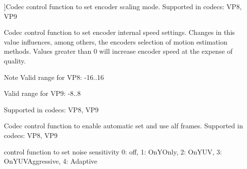 \begin{Desc}
\begin{description}
{}]Codec control function to set encoder scaling mode. Supported in codecs\+: V\+P8, V\+P9 \item[{\em 
V\+P8\+E\+\_\+\+S\+E\+T\+\_\+\+C\+P\+U\+U\+S\+ED\hypertarget{group__vp8__encoder_gga6deae3d561c838952552c3d3756322eca953ff0eaa2fcdc2ecd627e449b026853}{}\label{group__vp8__encoder_gga6deae3d561c838952552c3d3756322eca953ff0eaa2fcdc2ecd627e449b026853}
}]Codec control function to set encoder internal speed settings. Changes in this value influences, among others, the encoder\textquotesingle{}s selection of motion estimation methods. Values greater than 0 will increase encoder speed at the expense of quality.

\begin{DoxyNote}{Note}
Valid range for V\+P8\+: -\/16..16 

Valid range for V\+P9\+: -\/8..8
\end{DoxyNote}
Supported in codecs\+: V\+P8, V\+P9 \item[{\em 
V\+P8\+E\+\_\+\+S\+E\+T\+\_\+\+E\+N\+A\+B\+L\+E\+A\+U\+T\+O\+A\+L\+T\+R\+EF\hypertarget{group__vp8__encoder_gga6deae3d561c838952552c3d3756322eca24a5530efabb8b4949d01622b1d72cb0}{}\label{group__vp8__encoder_gga6deae3d561c838952552c3d3756322eca24a5530efabb8b4949d01622b1d72cb0}
}]Codec control function to enable automatic set and use alf frames. Supported in codecs\+: V\+P8, V\+P9 \item[{\em 
V\+P8\+E\+\_\+\+S\+E\+T\+\_\+\+N\+O\+I\+S\+E\+\_\+\+S\+E\+N\+S\+I\+T\+I\+V\+I\+TY\hypertarget{group__vp8__encoder_gga6deae3d561c838952552c3d3756322eca3fa90cb70bade72af3c2d8d91471a36c}{}\label{group__vp8__encoder_gga6deae3d561c838952552c3d3756322eca3fa90cb70bade72af3c2d8d91471a36c}
}]control function to set noise sensitivity 0\+: off, 1\+: On\+Y\+Only, 2\+: On\+Y\+UV, 3\+: On\+Y\+U\+V\+Aggressive, 4\+: Adaptive


\end{description}
\end{Desc}
